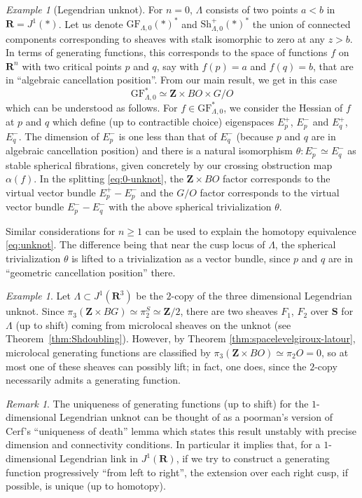 \documentclass[12pt,a4paper]{article}
\numberwithin{equation}{section}
\theoremstyle{definition}
\theoremstyle{remark}
\newtheorem{remark}[equation]{Remark}
\newtheorem{example}[equation]{Example}
\newcommand{\Z}{\mathbf{Z}}
\newcommand{\R}{\mathbf{R}}
\newcommand{\Sh}{\mathrm{Sh}}
\renewcommand{\S}{\mathbf{S}}
\newcommand{\GF}{\mathrm{GF}}
\begin{document}
\begin{example}[Legendrian unknot]
For $n=0$, $\Lambda$ consists of two points $a<b$ in $\R=J^1(*)$. Let us denote $\GF_{\Lambda,0}(*)^*$ and $\Sh_{\Lambda,0}^+(*)^*$
the union of connected components corresponding to sheaves with stalk isomorphic to zero at any $z>b$.
In terms of generating functions, this corresponds to the space of functions $f$ on $\R^n$ with two critical points $p$ and $q$,
say with $f(p)=a$ and $f(q)=b$, that are in ``algebraic cancellation position''.
From our main result, we get in this case
\begin{equation}\label{eq:0-unknot}
\GF_{\Lambda,0}^* \simeq \Z\times BO\times G/O
\end{equation}
which can be understood as follows. For $f\in \GF_{\Lambda,0}^*$, we consider the Hessian of $f$ at $p$ and $q$ which define
(up to contractible choice) eigenspaces $E^+_p$, $E^-_p$ and $E^+_q$, $E^-_q$. The dimension of $E^-_p$
is one less than that of $E^-_q$ (because $p$ and $q$ are in algebraic cancellation position)
and there is a natural isomorphism $\theta:E^-_p\simeq E^-_q$ as stable spherical fibrations, given concretely
by our crossing obstruction map $\alpha(f)$. In the splitting \eqref{eq:0-unknot}, the $\Z\times BO$ factor
corresponds to the virtual vector bundle $E^+_p-E^-_p$ and the $G/O$ factor corresponds to
the virtual vector bundle $E^-_p-E^-_q$ with the above spherical trivialization $\theta$.

Similar considerations for $n\geq 1$ can be used to explain the homotopy equivalence \eqref{eq:unknot}. The difference being
that near the cusp locus of $\Lambda$, the spherical trivialization $\theta$ is lifted to a trivialization
as a vector bundle, since $p$ and $q$ are in ``geometric cancellation position'' there.
\end{example}

\begin{example}\label{ex:3-spherenotlifting}
Let $\Lambda \subset J^1(\R^3)$ be the $2$-copy of the three dimensional Legendrian unknot. Since $\pi_3 (\Z\times BG)\simeq \pi_2^S\simeq \Z/2$,
there are two sheaves $F_1$, $F_2$ over $\S$ for $\Lambda$ (up to shift) coming from microlocal sheaves on the unknot (see Theorem~\ref{thm:Shdoubling}).
However, by Theorem \ref{thm:spacelevelgiroux-latour}, microlocal generating functions are classified by $\pi_3(\Z\times BO)\simeq \pi_2 O=0$, so at most one of these sheaves can possibly lift; in fact, one does, since the $2$-copy necessarily admits a generating function.
\end{example}

\begin{remark}\label{rem:cerfuniquenessofdeath}
The uniqueness of generating functions (up to shift) for the $1$-dimensional Legendrian unknot can be thought of
as a poorman's version of Cerf's ``uniqueness of death'' lemma which states this result unstably with precise dimension
and connectivity conditions. In particular it implies that, for a $1$-dimensional Legendrian link in $J^1(\R)$, if we try
to construct a generating function progressively ``from left to right'', the extension over each right cusp, if possible,
is unique (up to homotopy).
\end{remark}
\end{document}
